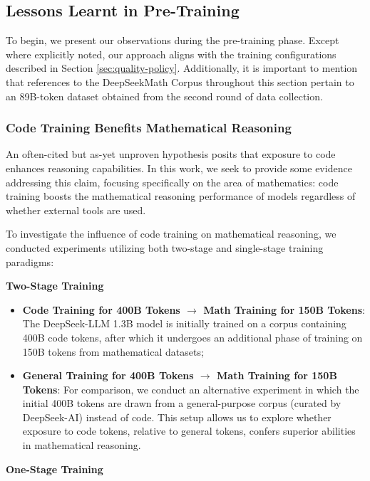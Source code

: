 \begin{itemize}[topsep=0pt]
\subsection{Lessons Learnt in Pre-Training}

To begin, we present our observations during the pre-training phase. Except where explicitly noted, our approach aligns with the training configurations described in Section \ref{sec:quality-policy}. Additionally, it is important to mention that references to the DeepSeekMath Corpus throughout this section pertain to an 89B-token dataset obtained from the second round of data collection.

\subsubsection{Code Training Benefits Mathematical Reasoning}

An often-cited but as-yet unproven hypothesis posits that exposure to code enhances reasoning capabilities. In this work, we seek to provide some evidence addressing this claim, focusing specifically on the area of mathematics: code training boosts the mathematical reasoning performance of models regardless of whether external tools are used.

To investigate the influence of code training on mathematical reasoning, we conducted experiments utilizing both two-stage and single-stage training paradigms:

\textbf{Two-Stage Training}

\begin{itemize}[topsep=0pt]
    \item \textbf{Code Training for 400B Tokens $\rightarrow$ Math Training for 150B Tokens}: The DeepSeek-LLM 1.3B model is initially trained on a corpus containing 400B code tokens, after which it undergoes an additional phase of training on 150B tokens from mathematical datasets;
    \item \textbf{General Training for 400B Tokens $\rightarrow$ Math Training for 150B Tokens}: For comparison, we conduct an alternative experiment in which the initial 400B tokens are drawn from a general-purpose corpus (curated by DeepSeek-AI) instead of code. This setup allows us to explore whether exposure to code tokens, relative to general tokens, confers superior abilities in mathematical reasoning.
\end{itemize}

\textbf{One-Stage Training}


\end{itemize}
